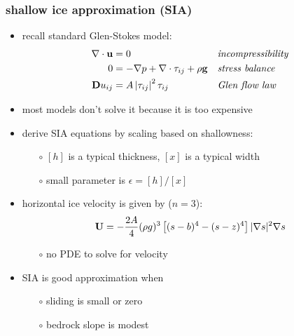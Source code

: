 \documentclass[10pt,hyperref={pdfpagelabels=true}]{beamer}
\newcommand{\eps}{\epsilon}
\begin{document}
\begin{frame}
  \frametitle{shallow ice approximation (SIA)}

\begin{itemize}
\item recall standard Glen-Stokes model:
\small
\begin{align*}
\nabla \cdot \mathbf{u} &= 0 &&\text{\emph{incompressibility}} \\
0 &= - \nabla p + \nabla \cdot \tau_{ij} + \rho \mathbf{g} &&\text{\emph{stress balance}} \\
\mathbf{D}u_{ij} &= A \left|\tau_{ij}\right|^2 \tau_{ij} &&\text{\emph{Glen flow law}}
\end{align*}
\normalsize
\item \alert{most models don't solve it because it is too expensive}
\item derive SIA equations by scaling based on shallowness:
  \begin{itemize}
  \item[$\circ$] $[h]$ is a typical thickness, $[x]$ is a typical width
  \item[$\circ$] small parameter is $\eps = [h] / [x]$
  \end{itemize}
\item horizontal ice velocity is given by ($n=3$): 
  $${\bf U}  =  - \frac{2 A}{4} (\rho g)^{3} \left[ (s-b)^4 - (s - z)^4  \right] 
|\nabla s |^{2} \nabla s$$

\vspace{-2mm}
  \begin{itemize}
  \item[$\circ$] no PDE to solve for velocity
  \end{itemize}
\item SIA is good approximation when
  \begin{itemize}
  \item[$\circ$] sliding is small or zero
  \item[$\circ$] bedrock slope is modest
  \end{itemize}
\end{itemize}
\end{frame}
\end{document}
